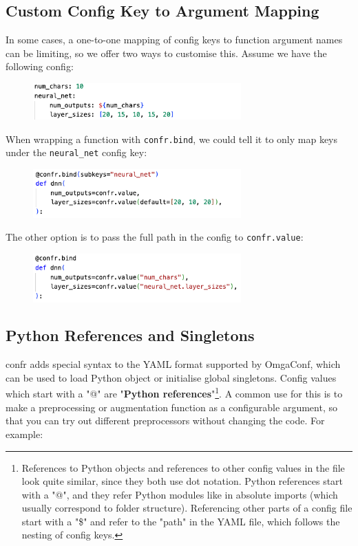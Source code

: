 \documentclass{itatnew}
\begin{document}
\subsection{Custom Config Key to Argument Mapping}

In some cases, a one-to-one mapping of config keys to function argument names can be limiting, so we offer two ways to customise this. Assume we have the following config:

\begin{figure}[H]
    \centering
    \includegraphics[width=8cm]{c3.png}
\end{figure}

When wrapping a function with \texttt{confr.bind}, we could tell it to only map keys under the \texttt{neural_net} config key:

\begin{figure}[H]
    \centering
    \includegraphics[width=8cm]{c4.png}
\end{figure}

The other option is to pass the full path in the config to \texttt{confr.value}:

\begin{figure}[H]
    \centering
    \includegraphics[width=8cm]{c5.png}
\end{figure}


\subsection{Python References and Singletons}

confr adds special syntax to the YAML format supported by OmgaConf, which can be used to load Python object or initialise global singletons. Config values which start with a "@" are "\textbf{Python references}"\footnote{References to Python objects and references to other config values in the file look quite similar, since they both use dot notation. Python references start with a "@", and they refer Python modules like in absolute imports (which usually correspond to folder structure). Referencing other parts of a config file start with a "\$" and refer to the "path" in the YAML file, which follows the nesting of config keys.}. A common use for this is to make a preprocessing or augmentation function as a configurable argument, so that you can try out different preprocessors without changing the code. For example:
\end{document}
